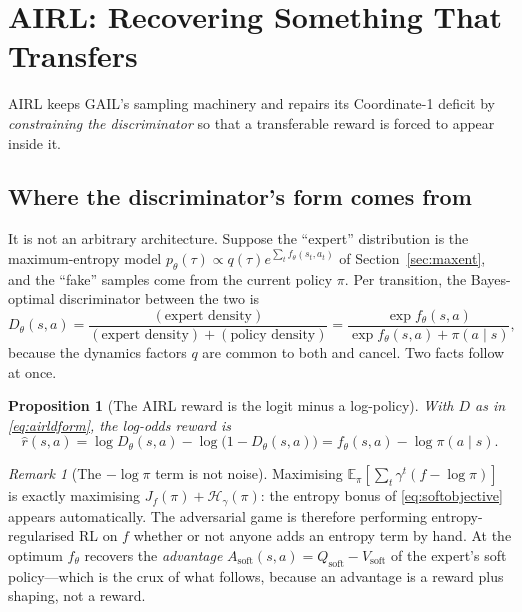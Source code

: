 \documentclass[11pt]{article}
\theoremstyle{plain}
\newtheorem{proposition}[theorem]{Proposition}
\theoremstyle{definition}
\theoremstyle{remark}
\newtheorem{remark}[theorem]{Remark}
\newcommand{\E}{\mathbb{E}}
\newcommand{\soft}{\mathrm{soft}}
\begin{document}
\section{AIRL: Recovering Something That Transfers}
\label{sec:airl}

AIRL \cite{fu2018} keeps GAIL's sampling machinery and repairs its
Coordinate-1 deficit by \emph{constraining the discriminator} so that a
transferable reward is forced to appear inside it.

\subsection{Where the discriminator's form comes from}

It is not an arbitrary architecture. Suppose the ``expert'' distribution
is the maximum-entropy model $p_\theta(\tau)\propto
q(\tau)e^{\sum_t f_\theta(s_t,a_t)}$ of Section~\ref{sec:maxent}, and the
``fake'' samples come from the current policy $\pi$. Per transition, the
Bayes-optimal discriminator between the two is
\begin{equation}
D_\theta(s,a) = \frac{(\text{expert density})}{(\text{expert
density})+(\text{policy density})} = \frac{\exp f_\theta(s,a)}{\exp
f_\theta(s,a) + \pi(a\mid s)},
\label{eq:airldform}
\end{equation}
because the dynamics factors $q$ are common to both and cancel. Two facts
follow at once.

\begin{proposition}[The AIRL reward is the logit minus a
log-policy]\label{prop:airllogit}
With $D$ as in \eqref{eq:airldform}, the log-odds reward is
\begin{equation}
\hat r(s,a) = \log D_\theta(s,a) - \log\big(1-D_\theta(s,a)\big) =
f_\theta(s,a) - \log\pi(a\mid s).
\label{eq:airlreward}
\end{equation}
\end{proposition}

\begin{remark}[The $-\log\pi$ term is not noise]
Maximising $\E_\pi[\sum_t \gamma^t(f-\log\pi)]$ is exactly maximising
$J_f(\pi) + \mathcal{H}_\gamma(\pi)$: the entropy bonus of
\eqref{eq:softobjective} appears automatically. The adversarial game is
therefore performing entropy-regularised RL on $f$ whether or not anyone
adds an entropy term by hand. At the optimum $f_\theta$ recovers the
\emph{advantage} $A_\soft(s,a) = Q_\soft - V_\soft$ of the expert's soft
policy---which is the crux of what follows, because an advantage is a
reward plus shaping, not a reward.
\end{remark}
\end{document}
